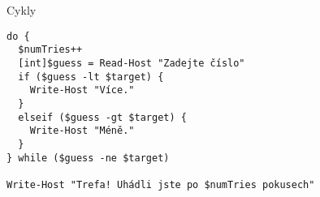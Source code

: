 \documentclass[main.tex]{subfiles}
\begin{document}
\begin{frame}{Cykly}
\begin{verbatim}
do {
  $numTries++
  [int]$guess = Read-Host "Zadejte číslo"
  if ($guess -lt $target) {
    Write-Host "Více."
  }
  elseif ($guess -gt $target) {
    Write-Host "Méně."
  }
} while ($guess -ne $target)

Write-Host "Trefa! Uhádli jste po $numTries pokusech"
\end{verbatim}
\end{frame}
\end{document}
